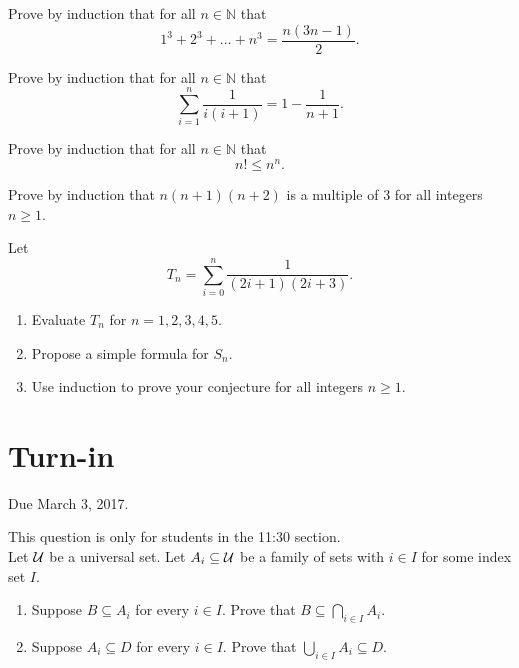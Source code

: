 \documentclass[12pt]{article}
\begin{document}
\begin{qu}
Prove by induction that for all $n \in \mathbb{N}$ that
$$ 1^3 + 2^3 + \dots + n^3 = \frac{n(3n-1)}{2}.$$
\end{qu}

\begin{qu}
Prove by induction that for all $n \in \mathbb{N}$ that
$$ \sum_{i=1}^n \frac{1}{i(i+1)} = 1-\frac{1}{n+1}.$$
\end{qu}

\begin{qu}
Prove by induction that for all $n \in \mathbb{N}$ that
$$ n! \leq n^n.$$
\end{qu}

\begin{qu}
Prove by induction that $n(n+1)(n+2)$ is a multiple of $3$ for all integers $n\geq 1$.
\end{qu}

\begin{qu}
Let $$T_n = \sum_{i=0}^n \frac{1}{(2i+1)(2i+3)}.$$

\begin{enumerate}[label=\alph*)]
\item Evaluate $T_n$ for $n = 1, 2, 3, 4, 5$.
\item Propose a simple formula for $S_n$.
\item Use induction to prove your conjecture for all integers $n \geq 1$.
\end{enumerate}
\end{qu}

\newpage
\section{Turn-in} 

Due March 3, 2017.


\begin{qu}
This question is only for students in the 11:30 section.\\

Let $\mathcal{U}$ be a universal set. Let $A_i \subseteq \mathcal{U}$ be a family of sets with $i \in I$ for some index set $I$.
\begin{enumerate}[label=\alph*)]
\item Suppose $B \subseteq A_i$ for every $i \in I$. Prove that $B \subseteq \bigcap_{i \in I} A_i$.
\item Suppose $A_i \subseteq D$ for every $i \in I$. Prove that $\bigcup_{i \in I} A_i \subseteq D$.
\end{enumerate}
\end{qu}
\end{document}
